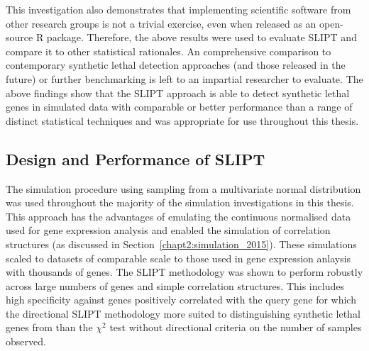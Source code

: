 This investigation also demonstrates that implementing scientific software from other research groups is not a trivial exercise, even when released as an open-source R package. Therefore, the above results were used to evaluate \gls{SLIPT} and compare it to other statistical rationales. An comprehensive comparison to contemporary \gls{synthetic lethal} detection approaches (and those released in the future) or further benchmarking is left to an impartial researcher to evaluate. The above findings show that the \gls{SLIPT} approach is able to detect \gls{synthetic lethal} genes in simulated data with comparable or better performance than a range of distinct statistical techniques and was appropriate for use throughout this thesis.  

\subsection{Design and Performance of SLIPT}

The simulation procedure using sampling from a multivariate normal distribution was used throughout the majority of the simulation investigations in this thesis. This approach has the advantages of emulating the continuous normalised  data used for \gls{gene expression} analysis and enabled the simulation of correlation structures (as discussed in Section~\ref{chapt2:simulation_2015}). These simulations scaled to datasets of comparable scale to those used in \gls{gene expression} anlaysis with thousands of genes. The \gls{SLIPT} methodology was shown to perform robustly across large numbers of genes and simple correlation structures. This includes high specificity against genes positively correlated with the query gene for which the directional \gls{SLIPT} methodology more suited to distinguishing \gls{synthetic lethal} genes from than the $\chi^2$ test without directional criteria on the number of samples observed.

